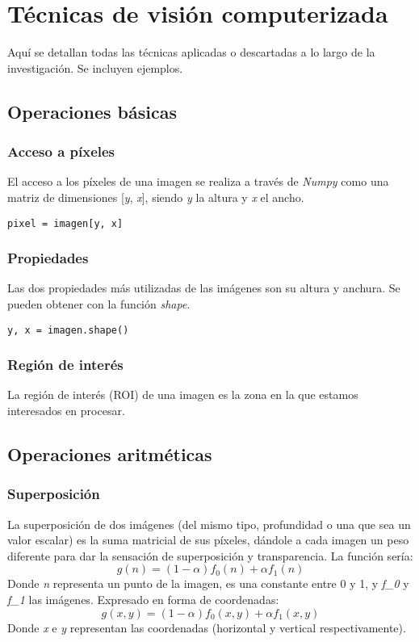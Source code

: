 \chapter{Técnicas de visión computerizada}
Aquí se detallan todas las técnicas aplicadas o descartadas 
a lo largo de la investigación. Se incluyen ejemplos.
\section{Operaciones básicas}
\subsection{Acceso a píxeles}
El acceso a los píxeles de una imagen se realiza a través de
\emph{Numpy} como una matriz de dimensiones [\emph{y}, \emph{x}],
siendo \emph{y} la altura y \emph{x} el ancho.
\begin{verbatim}
pixel = imagen[y, x]
\end{verbatim}

\subsection{Propiedades}
Las dos propiedades más utilizadas de las imágenes son su altura y anchura.
Se pueden obtener con la función \emph{shape}.
\begin{verbatim}
y, x = imagen.shape()
\end{verbatim}

\subsection{Región de interés}
La región de interés (ROI) de una imagen es la zona en la que estamos
interesados en procesar.

\section{Operaciones aritméticas}
\subsection{Superposición}
La superposición de dos imágenes (del mismo tipo, profundidad o una
que sea un valor escalar) es la suma matricial de sus píxeles,
dándole a cada imagen un peso diferente para dar la sensación
de superposición y transparencia. La función sería:
\begin{equation*}
g(n) = (1 - \alpha)f_0(n) + \alpha f_1(n)
\end{equation*}
Donde \emph{n} representa un punto de la imagen, \emph{\alpha} es 
una constante entre 0 y 1, y \emph{f_0} y \emph{f_1} las imágenes.
Expresado en forma de coordenadas:
\begin{equation*}
g(x, y) = (1 - \alpha)f_0(x, y) + \alpha f_1(x, y)
\end{equation*}
Donde \emph{x} e \emph{y} representan las coordenadas (horizontal y 
vertical respectivamente).


